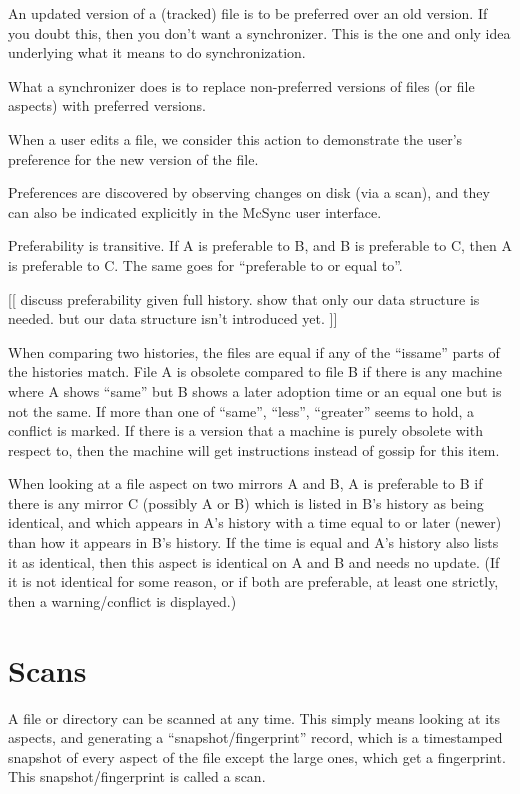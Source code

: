 \documentclass{book}
\begin{document}
An updated version of a (tracked) file is to be preferred over an old version.  If you doubt this, then you don't want a synchronizer.  This is the one and only idea underlying what it means to do synchronization.

What a synchronizer does is to replace non-preferred versions of files (or file aspects) with preferred versions.

When a user edits a file, we consider this action to demonstrate the user's preference for the new version of the file.

Preferences are discovered by observing changes on disk (via a scan), and they can also be indicated explicitly in the McSync user interface.

Preferability is transitive.  If A is preferable to B, and B is preferable to C, then A is preferable to C.  The same goes for ``preferable to or equal to''.

[[ discuss preferability given full history.  show that only our data structure is needed.  but our data structure isn't introduced yet. ]]

When comparing two histories, the files are equal if any of the ``issame'' parts of the histories match.  File A is obsolete compared to file B if there is any machine where A shows ``same'' but B shows a later adoption time or an equal one but is not the same.  If more than one of ``same'', ``less'', ``greater'' seems to hold, a conflict is marked.  If there is a version that a machine is purely obsolete with respect to, then the machine will get instructions instead of gossip for this item.

When looking at a file aspect on two mirrors A and B, A is preferable to B if there is any mirror C (possibly A or B) which is listed in B's history as being identical, and which appears in A's history with a time equal to or later (newer) than how it appears in B's history.  If the time is equal and A's history also lists it as identical, then this aspect is identical on A and B and needs no update.  (If it is not identical for some reason, or if both are preferable, at least one strictly, then a warning/conflict is displayed.)


\section{Scans}

A file or directory can be scanned at any time.  This simply means looking at its aspects, and generating a ``snapshot/fingerprint'' record, which is a timestamped snapshot of every aspect of the file except the large ones, which get a fingerprint.  This snapshot/fingerprint is called a scan.
\end{document}
